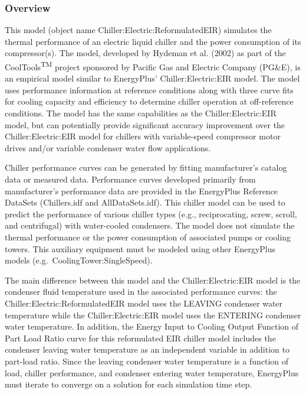 \subsubsection{Overview}\label{overview-3-002}

This model (object name Chiller:Electric:ReformulatedEIR) simulates the thermal performance of an electric liquid chiller and the power consumption of its compressor(s). The model, developed by Hydeman et al. (2002) as part of the CoolTools\textsuperscript{TM} project sponsored by Pacific Gas and Electric Company (PG\&E), is an empirical model similar to EnergyPlus' Chiller:Electric:EIR model. The model uses performance information at reference conditions along with three curve fits for cooling capacity and efficiency to determine chiller operation at off-reference conditions. The model has the same capabilities as the Chiller:Electric:EIR model, but can potentially provide significant accuracy improvement over the Chiller:Electric:EIR model for chillers with variable-speed compressor motor drives and/or variable condenser water flow applications.

Chiller performance curves can be generated by fitting manufacturer's catalog data or measured data. Performance curves developed primarily from manufacturer's performance data are provided in the EnergyPlus Reference DataSets (Chillers.idf and AllDataSets.idf). This chiller model can be used to predict the performance of various chiller types (e.g., reciprocating, screw, scroll, and centrifugal) with water-cooled condensers. The model does not simulate the thermal performance or the power consumption of associated pumps or cooling towers. This auxiliary equipment must be modeled using other EnergyPlus models (e.g.~CoolingTower:SingleSpeed).

The main difference between this model and the Chiller:Electric:EIR model is the condenser fluid temperature used in the associated performance curves: the Chiller:Electric:ReformulatedEIR model uses the LEAVING condenser water temperature while the Chiller:Electric:EIR model uses the ENTERING condenser water temperature. In addition, the Energy Input to Cooling Output Function of Part Load Ratio curve for this reformulated EIR chiller model includes the condenser leaving water temperature as an independent variable in addition to part-load ratio. Since the leaving condenser water temperature is a function of load, chiller performance, and condenser entering water temperature, EnergyPlus must iterate to converge on a solution for each simulation time step.

